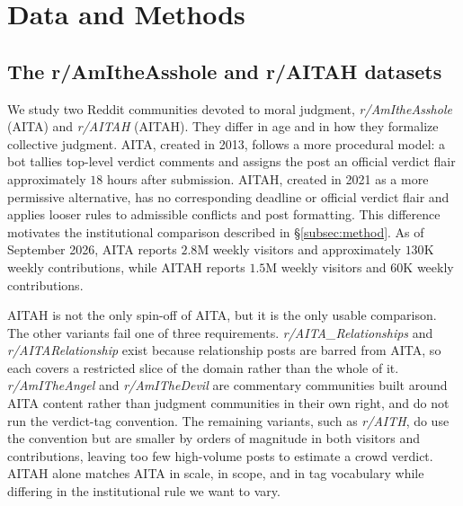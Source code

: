 \section{Data and Methods}
\label{sec:data-method}



\subsection{The r/AmItheAsshole and r/AITAH datasets}
\label{subsec:dataset}

We study two Reddit communities devoted to moral judgment,
\emph{r/AmItheAsshole} (AITA) and \emph{r/AITAH} (AITAH). They differ in age
and in how they formalize collective judgment.
AITA, created in 2013, follows a more procedural model: a bot tallies top-level
verdict comments and assigns the post an official verdict flair approximately
$18$ hours after submission. AITAH, created in 2021 as a more permissive
alternative, has no corresponding deadline or official verdict flair and
applies looser rules to admissible conflicts and post formatting. This
difference motivates the institutional comparison described in
\S\ref{subsec:method}. As of September 2026, AITA reports $2.8$M weekly visitors
and approximately $130$K weekly contributions, while AITAH reports $1.5$M
weekly visitors and $60$K weekly contributions.

AITAH is not the only spin-off of AITA, but it is the only usable comparison.
The other variants fail one of three requirements. \emph{r/AITA\_Relationships}
and \emph{r/AITARelationship} exist because relationship posts are barred from
AITA, so each covers a restricted slice of the domain rather than the whole of
it. \emph{r/AmITheAngel} and \emph{r/AmITheDevil} are commentary communities
built around AITA content rather than judgment communities in their own right,
and do not run the verdict-tag convention. The remaining variants, such as
\emph{r/AITH}, do use the convention but are smaller by orders of magnitude in
both visitors and contributions, leaving too few high-volume posts to estimate
a crowd verdict. AITAH alone matches AITA in scale, in scope, and in tag
vocabulary while differing in the institutional rule we want to vary.

